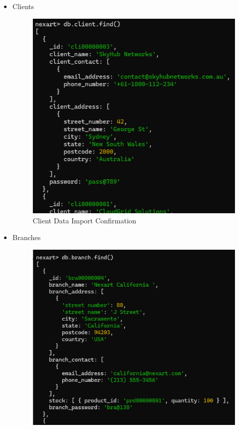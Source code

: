 \documentclass[a4Paper,12pt]{report}
\begin{document}
\begin{itemize}
\item Clients
\begin{figure}[H]
\centering
\includegraphics[scale=0.5]{images/client_data_import_confirmation.png}
\caption{Client Data Import Confirmation}
\end{figure}
\item Branches
\begin{figure}[H]
\centering
\includegraphics[scale=0.4]{images/branch_data_import_confirmation.png}

\end{figure}
\end{itemize}
\end{document}

